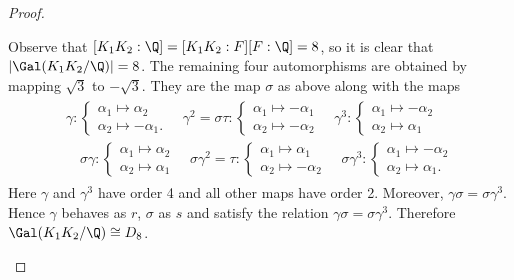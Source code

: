 \documentclass[10pt]{amsart}
\begin{document}
\begin{thm}
\begin{proof}
\begin{alphaenum}
    \item
      Observe that $[K_1K_2:\Q] = [K_1K_2:F][F:\Q] = 8$, so it is clear that $|\Gal(K_1K_2/\Q)| = 8$.
      The remaining four automorphisms are obtained by mapping $\sqrt{3}$ to $-\sqrt{3}$.
      They are the map $\sigma$ as above along with the maps
      \begin{align*}
        \begin{split}
          \gamma : \begin{cases}
            \alpha_1 \longmapsto \alpha_2\\
            \alpha_2 \longmapsto -\alpha_1.
          \end{cases}
          \quad \gamma^2 = \sigma\tau: \begin{cases}
            \alpha_1 \longmapsto -\alpha_1\\
            \alpha_2 \longmapsto -\alpha_2
          \end{cases}      
          \quad \gamma^3 : \begin{cases}
            \alpha_1 \longmapsto -\alpha_2\\
            \alpha_2 \longmapsto \alpha_1
          \end{cases}\\
          \quad \sigma\gamma : \begin{cases}
            \alpha_1 \longmapsto \alpha_2\\
            \alpha_2 \longmapsto \alpha_1
          \end{cases}
          \quad \sigma\gamma^2 = \tau: \begin{cases}
            \alpha_1 \longmapsto \alpha_1\\
            \alpha_2 \longmapsto -\alpha_2
          \end{cases}
          \quad \sigma\gamma^3 : \begin{cases}
            \alpha_1 \longmapsto -\alpha_2\\
            \alpha_2 \longmapsto \alpha_1.
          \end{cases}
        \end{split}
      \end{align*}
      Here $\gamma$ and $\gamma^3$ have order 4 and all other maps have order 2.
      Moreover, $\gamma\sigma = \sigma\gamma^3$.
      Hence $\gamma$ behaves as $r$, $\sigma$ as $s$ and satisfy the relation $\gamma\sigma = \sigma\gamma^3$.
      Therefore $\Gal(K_1K_2/\Q) \cong D_8$.
  \end{alphaenum}
  \end{proof}
\end{thm}
\end{document}

